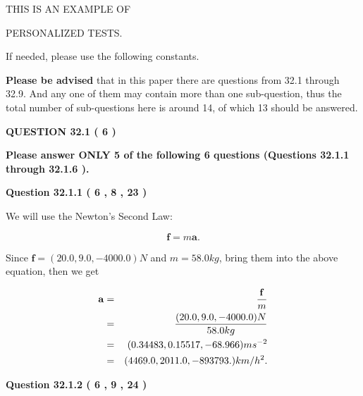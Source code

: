 \documentclass[12pt]{article}
\begin{document}
   
   
   
 \vspace{0.2in}
 
 
{\Huge  THIS IS AN EXAMPLE OF}
 
{\Huge  PERSONALIZED TESTS. }
 
If needed, please use the following constants.
 
 
 
{\textbf{\large{Please be advised}}} that in this paper there are questions from
32.1 through
32.9.
And any one of them may contain more than one sub-question, thus the total number
of sub-questions here is around 14, of which
13 should be answered.
 
\vspace{0.3in}
 
 
   
   
  
\vspace{0.2in}
  
{\textbf{\Large{QUESTION
32.1 
 (           6 )
}}}
  
  
{\textbf{\Large{Please answer ONLY  %
           5  %
 of the following  %
           6  %
 questions (Questions  %
32.1.1 %
 through  %
32.1.6 %
 ). }}}
   
   
  
\vspace{0.2in}
  
{\textbf{\Large{Question
32.1.1 
 (           6 ,           8 ,          23 )
}}}
  
  
 
 

We will use the Newton's Second Law:
 
\[
\mathbf{f}=m\mathbf{a}.
\]
 
Since $\mathbf{f}=( %
20.0,  %
9.0,  %
-4000.0 )N$
and $m= %
58.0kg$, bring them into the above equation, then we get
 
\begin{eqnarray*}
\mathbf{a}&=&\frac{\mathbf{f}}m  \\
&=&\frac{(
20.0 ,
9.0 ,
-4000.0 )N
}{ %
58.0 kg}  \\
&=&(
0.34483 ,
0.15517,
-68.966
)ms^{-2} \\
&=&(
4469.0 ,
2011.0 ,
-893793.
)km/h^2.
\end{eqnarray*}
 
 
 
  
\vspace{0.2in}
  
{\textbf{\Large{Question
32.1.2 
 (           6 ,           9 ,          24 )
}}}
  
\end{document}
